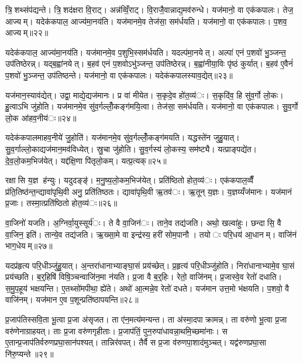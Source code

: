 त्रि॒शथ्संप॑द्यन्ते। त्रि॒शद॑क्षरा वि॒राट्। अन्न॑व्विँ॒राट्। वि॒राजै॒वान्नाद्य॒मव॑रुन्धे। यज॑मानो॒ वा एक॑कपालः। तेज॒ आज्यम्। यदेक॑कपाल॒ आज्य॑मा॒नय॑ति। यज॑मानमे॒व तेज॑सा॒ सम॑र्धयति। यज॑मानो॒ वा एक॑कपालः। प॒शव॒ आज्यम्॥२२॥

यदेक॑कपाल॒ आज्य॑मा॒नय॑ति। यज॑मानमे॒व प॒शुभि॒स्सम॑र्धयति। यदल्प॑मा॒नयेत्। अल्पा॑ एनं प॒शवो॑ भु॒ञ्जन्त॒ उप॑तिष्ठेरन्न्। यद्ब॒ह्वा॑नयेत्। ब॒हव॑ एनं प॒शवोऽभु॑ञ्जन्त॒ उप॑तिष्ठेरन्न्। ब॒ह्वा॑नीया॒विः पृ॑ष्ठं कुर्यात्। ब॒हव॑ ए॒वैनं॑ प॒शवो॑ भु॒ञ्जन्त॒ उप॑तिष्ठन्ते। यज॑मानो॒ वा एक॑कपालः। यदेक॑कपालस्याव॒द्येत्॥२३॥

यज॑मान॒स्याव॑द्येत्। उद्वा॒ माद्ये॒द्यज॑मानः। प्र वा॑ मीयेत। स॒कृदे॒व हो॑त॒व्य॑ः। स॒कृदि॑व॒ हि सु॑व॒र्गो लो॒कः। हु॒त्वाऽभि जु॑होति। यज॑मानमे॒व सु॑व॒र्गल्लोँ॒कङ्ग॑मयि॒त्वा। तेज॑सा॒ सम॑र्धयति। यज॑मानो॒ वा एक॑कपालः। सु॒व॒र्गो लो॒क आ॑हव॒नीय॑ः॥२४॥

यदेक॑कपालमाहव॒नीये॑ जु॒होति॑। यज॑मानमे॒व सु॑व॒र्गल्लोँ॒कङ्ग॑मयति। यद्धस्ते॑न जुहु॒यात्। सु॒व॒र्गाल्लो॒काद्यज॑मान॒मव॑विध्येत्। स्रु॒चा जु॑होति। सु॒व॒र्गस्य॑ लो॒कस्य॒ सम॑ष्ट्यै। यत्प्राङ्पद्ये॑त। दे॒व॒लो॒कम॒भिज॑येत्। यद्द॑क्षि॒णा पि॑तृलो॒कम्। यत्प्र॒त्यक्॥२५॥

रक्षासि य॒ज्ञ ह॑न्युः। यदुदङ्ङ्॑। म॒नु॒ष्य॒लो॒कम॒भिज॑येत्। प्रति॑ष्ठितो होत॒व्य॑ः। एक॑कपाल॒व्वैँ प्र॑ति॒तिष्ठ॑न्त॒न्द्यावा॑पृथि॒वी अनु॒ प्रति॑तिष्ठतः। द्यावा॑पृथि॒वी ऋ॒तव॑ः। ऋ॒तून् य॒ज्ञः। य॒ज्ञय्यँज॑मानः। यज॑मानं प्र॒जाः। तस्मा॒त्प्रति॑ष्ठितो होत॒व्य॑ः॥२६॥

वा॒जिनो॑ यजति। अ॒ग्निर्वा॒युस्सूर्य॑ः। ते वै वा॒जिन॑ः। ताने॒व तद्य॑जति। अथो॒ खल्वा॑हुः। छन्दासि॒ वै वा॒जिन॒ इति॑। तान्ये॒व तद्य॑जति। ऋ॒ख्सा॒मे वा इन्द्र॑स्य॒ हरी॑ सोम॒पानौ। तयोः परि॒धय॑ आ॒धानम्। वाजि॑नं भाग॒धेयम्॥२७॥

यदप्र॑हृत्य परि॒धीञ्जु॑हु॒यात्। अ॒न्तरा॑धानाभ्याङ्घा॒सं प्रय॑च्छेत्। प्र॒हृत्य॑ परि॒धीञ्जु॑होति। निरा॑धानाभ्यामे॒व घा॒सं प्रय॑च्छति। ब॒र्॒हिषि॑ विषि॒ञ्चन्वाजि॑न॒मा न॑यति। प्र॒जा वै ब॒र्॒हिः। रेतो॒ वाजि॑नम्। प्र॒जास्वे॒व रेतो॑ दधाति। स॒मु॒प॒हूय॑ भक्षयन्ति। ए॒तथ्सो॑मपीथा॒ ह्ये॑ते। अथो॑ आ॒त्मन्ने॒व रेतो॑ दधते। यज॑मान उत्त॒मो भ॑क्षयति। प॒शवो॒ वै वाजि॑नम्। यज॑मान ए॒व प॒शून्प्रति॑ष्ठापयन्ति॥२८॥


प्र॒जाप॑तिस्सवि॒ता भू॒त्वा प्र॒जा अ॑सृजत। ता ए॑न॒मत्य॑मन्यन्त। ता अ॑स्मा॒दपाक्रामन्न्। ता वरु॑णो भू॒त्वा प्र॒जा वरु॑णेनाग्राहयत्। ताः प्र॒जा वरु॑णगृहीताः। प्र॒जाप॑तिं॒ पुन॒रुपा॑धावन्ना॒थमि॒च्छमा॑नाः। स ए॒तान्प्र॒जाप॑तिर्वरुणप्रघा॒सान॑पश्यत्। तान्निर॑वपत्। तैर्वै स प्र॒जा व॑रुणपा॒शाद॑मुञ्चत्। यद्व॑रुणप्रघा॒सा नि॑रु॒प्यन्ते॥२९॥

